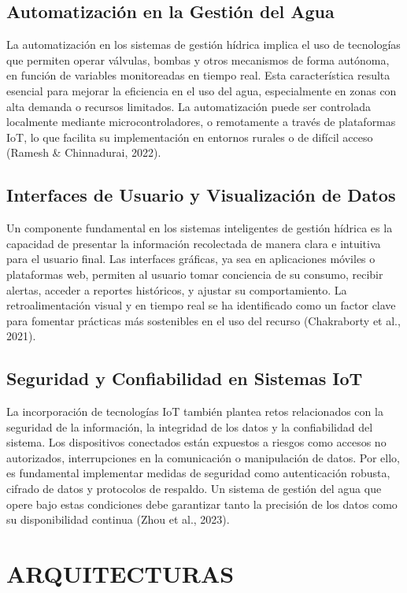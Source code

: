 \documentclass[conference]{IEEEtran}
\begin{document}
\subsection*{\textbf{Automatización en la Gestión del Agua}}
La automatización en los sistemas de gestión hídrica implica el uso de tecnologías que permiten operar válvulas, bombas y otros mecanismos de forma autónoma, en función de variables monitoreadas en tiempo real. Esta característica resulta esencial para mejorar la eficiencia en el uso del agua, especialmente en zonas con alta demanda o recursos limitados. La automatización puede ser controlada localmente mediante microcontroladores, o remotamente a través de plataformas IoT, lo que facilita su implementación en entornos rurales o de difícil acceso (Ramesh \& Chinnadurai, 2022).
\subsection*{\textbf{Interfaces de Usuario y Visualización de Datos}}
Un componente fundamental en los sistemas inteligentes de gestión hídrica es la capacidad de presentar la información recolectada de manera clara e intuitiva para el usuario final. Las interfaces gráficas, ya sea en aplicaciones móviles o plataformas web, permiten al usuario tomar conciencia de su consumo, recibir alertas, acceder a reportes históricos, y ajustar su comportamiento. La retroalimentación visual y en tiempo real se ha identificado como un factor clave para fomentar prácticas más sostenibles en el uso del recurso (Chakraborty et al., 2021).
\subsection*{\textbf{Seguridad y Confiabilidad en Sistemas IoT}}
La incorporación de tecnologías IoT también plantea retos relacionados con la seguridad de la información, la integridad de los datos y la confiabilidad del sistema. Los dispositivos conectados están expuestos a riesgos como accesos no autorizados, interrupciones en la comunicación o manipulación de datos. Por ello, es fundamental implementar medidas de seguridad como autenticación robusta, cifrado de datos y protocolos de respaldo. Un sistema de gestión del agua que opere bajo estas condiciones debe garantizar tanto la precisión de los datos como su disponibilidad continua (Zhou et al., 2023).

\section{ARQUITECTURAS}
\end{document}
